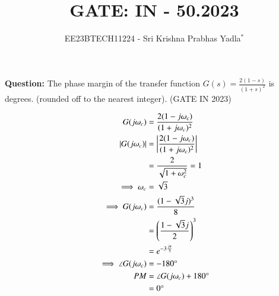 \documentclass[journal,12pt,twocolumn]{IEEEtran}
\theoremstyle{remark}
\begin{document}

\vspace{3cm}

\title{GATE: IN - 50.2023}
\author{EE23BTECH11224 - Sri Krishna Prabhas Yadla$^{*}$%
}
\maketitle
\newpage
\bigskip

\renewcommand{\thefigure}{\arabic{figure}}
\renewcommand{\thetable}{\arabic{table}}


\vspace{3cm}
\textbf{Question:} The phase margin of the transfer function $G(s) = \frac{2(1-s)}{(1+s)^2}$ is \underline{\quad} degrees. (rounded off to the nearest integer). \hfill (GATE IN 2023)\\
\solution
\begin{table}[htbp]
	\centering
	\def\arraystrech{1.5}
	
	\caption{}
	\label{tab:parameters}
\end{table}
\begin{align}
	G(j\omega_c) &= \frac{2(1-j\omega_c)}{(1+j\omega_c)^2} \\
	\left\vert G(j\omega_c)\right\vert &= \left\vert\frac{2(1-j\omega_c)}{(1+j\omega_c)^2}\right\vert \\
	&= \frac{2}{\sqrt{1+\omega_c^2}} = 1 \\
	\implies \omega_c &= \sqrt{3} \\
	\implies G(j\omega_c) &= \frac{(1-\sqrt{3}j)^3}{8} \\
	&= \left(\frac{1-\sqrt{3}j}{2}\right)^3 \\
	&= e^{-3\frac{j\pi}{3}} \\
	\implies \angle G(j\omega_c)&= -180\degree \\
	PM &= \angle G(j\omega_c) + 180\degree \\
	&= 0\degree
\end{align}
\end{document}
